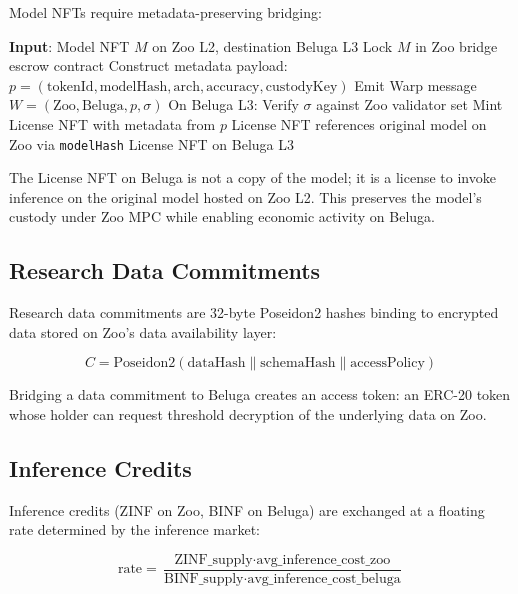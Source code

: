 \documentclass[11pt,letterpaper]{article}
\begin{document}
Model NFTs require metadata-preserving bridging:

\begin{algorithm}[t]
\caption{Model NFT Bridge Transfer}
\label{alg:nft-bridge}
\begin{algorithmic}[1]
\STATE \textbf{Input}: Model NFT $M$ on Zoo L2, destination Beluga L3
\STATE Lock $M$ in Zoo bridge escrow contract
\STATE Construct metadata payload:
\STATE \quad $p = (\text{tokenId}, \text{modelHash}, \text{arch}, \text{accuracy}, \text{custodyKey})$
\STATE Emit Warp message $W = (\text{Zoo}, \text{Beluga}, p, \sigma)$
\STATE On Beluga L3:
\STATE \quad Verify $\sigma$ against Zoo validator set
\STATE \quad Mint License NFT with metadata from $p$
\STATE \quad License NFT references original model on Zoo via \texttt{modelHash}
\RETURN License NFT on Beluga L3
\end{algorithmic}
\end{algorithm}

The License NFT on Beluga is not a copy of the model; it is a license to invoke inference on the original model hosted on Zoo L2. This preserves the model's custody under Zoo MPC while enabling economic activity on Beluga.

\subsection{Research Data Commitments}

Research data commitments are 32-byte Poseidon2 hashes binding to encrypted data stored on Zoo's data availability layer:

\begin{equation}
C = \text{Poseidon2}(\text{dataHash} \| \text{schemaHash} \| \text{accessPolicy})
\end{equation}

Bridging a data commitment to Beluga creates an access token: an ERC-20 token whose holder can request threshold decryption of the underlying data on Zoo.

\subsection{Inference Credits}

Inference credits (ZINF on Zoo, BINF on Beluga) are exchanged at a floating rate determined by the inference market:

\begin{equation}
\text{rate} = \frac{\text{ZINF\_supply} \cdot \text{avg\_inference\_cost\_zoo}}{\text{BINF\_supply} \cdot \text{avg\_inference\_cost\_beluga}}
\end{equation}
\end{document}
